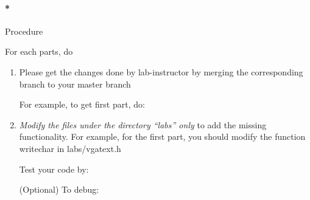 \documentclass[]{article}
\newenvironment{Shaded}{}{}
\newcommand{\OperatorTok}[1]{{#1}}
\newcommand{\ExtensionTok}[1]{{#1}}
\newcommand{\NormalTok}[1]{{#1}}
\let\oldparagraph\paragraph
\renewcommand{\paragraph}[1]{\oldparagraph{#1}\mbox{}}
\begin{document}
\paragraph*{Procedure}\label{procedure}

For each parts, do

\begin{enumerate}
\def\labelenumi{\arabic{enumi}.}
\item
  Please get the changes done by lab-instructor by merging the
  corresponding branch to your master branch

\begin{Shaded}
\end{Shaded}

  For example, to get first part, do:

\begin{Shaded}
\end{Shaded}
\item
  \emph{Modify the files under the directory ``labs'' only } to add the
  missing functionality. For example, for the first part, you should
  modify the function writechar in labs/vgatext.h

\begin{Shaded}
\end{Shaded}

  Test your code by:

\begin{Shaded}
\end{Shaded}

  (Optional) To debug:


\end{enumerate}
\end{document}
